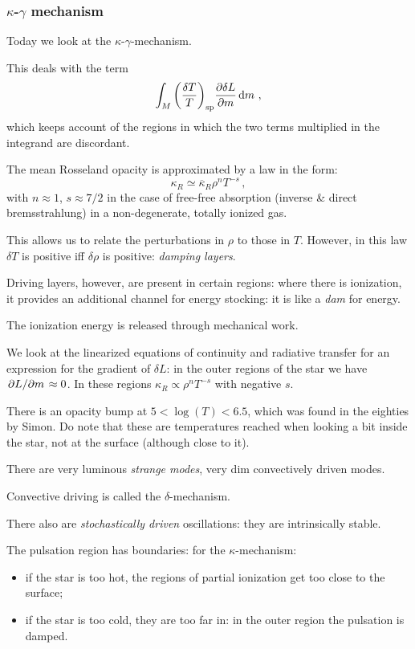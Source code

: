 \documentclass[main.tex]{subfiles}
\begin{document}
\subsubsection{\(\kappa \)-\(\gamma \) mechanism}

Today we look at the \(\kappa \)-\(\gamma \)-mechanism.

This deals with the term 
%
\begin{equation}
\int_M \qty(\frac{\delta T}{T})_{\text{sp}} \pdv{\delta L}{m} \dd{m} 
\,,
\end{equation}
%
which keeps account of the regions in which the two terms multiplied in the integrand are discordant.

The mean Rosseland opacity is approximated by a law in the form: 
%
\begin{equation}
  \kappa _R \simeq \overline{\kappa }_R \rho^{n} T^{-s}      
\,,
\end{equation}
%
with \(n \approx 1\), \(s \approx 7/2\) in the case of free-free absorption (inverse \& direct bremsstrahlung) in a non-degenerate, totally ionized gas.

This allows us to relate the perturbations in \(\rho \) to those in \(T\). However, in this law \(\delta T\) is positive iff \(\delta \rho \) is positive: \emph{damping layers}.

Driving layers, however, are present in certain regions: where there is ionization, it provides an additional channel for energy stocking: it is like a \emph{dam} for energy.

The ionization energy is released through mechanical work.

We look at the linearized equations of continuity and radiative transfer for an expression for the gradient of \(\delta L\): in the outer regions of the star we have \(\pdv*{L}{m} \approx 0\). 
In these regions \(\kappa _R \propto \rho^{n}T^{-s}\) with negative \(s\).

There is an opacity bump at \(5<\log(T)< 6.5 \), which was found in the eighties by Simon.
Do note that these are temperatures reached when looking a bit inside the star, not at the surface (although close to it).

There are very luminous \emph{strange modes}, very dim convectively driven modes.

Convective driving is called the \(\delta \)-mechanism.

There also are \emph{stochastically driven} oscillations: they are intrinsically stable.

The pulsation region has boundaries:
for the \(\kappa \)-mechanism:
\begin{itemize}
    \item if the star is too hot, the regions of partial ionization get too close to the surface;
    \item if the star is too cold, they are too far in: in the outer region the pulsation is damped.
\end{itemize}
\end{document}

